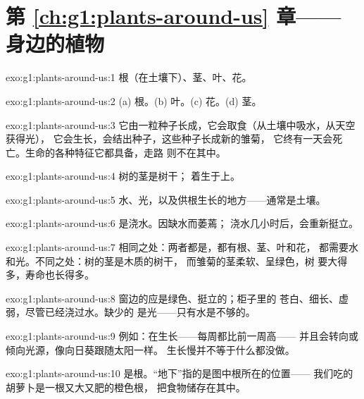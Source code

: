 \section*{第 \ref{ch:g1:plants-around-us} 章——身边的植物}

\begin{solution}{exo:g1:plants-around-us:1}
根（在土壤下）、茎、叶、花。
\end{solution}

\begin{solution}{exo:g1:plants-around-us:2}
(a) 根。(b) 叶。(c) 花。(d) 茎。
\end{solution}

\begin{solution}{exo:g1:plants-around-us:3}
它由一粒种子长成，它会取食（从土壤中吸水，从天空获得光），
它会生长，会结出种子，这些种子长成新的雏菊，
它终有一天会死亡。生命的各种特征它都具备，走路
则不在其中。
\end{solution}

\begin{solution}{exo:g1:plants-around-us:4}
树的茎是树干；
着生于上。
\end{solution}

\begin{solution}{exo:g1:plants-around-us:5}
水、光，以及供根生长的地方——通常是土壤。
\end{solution}

\begin{solution}{exo:g1:plants-around-us:6}
是浇水。因缺水而萎蔫；
浇水几小时后，会重新挺立。
\end{solution}

\begin{solution}{exo:g1:plants-around-us:7}
相同之处：两者都是，都有根、茎、叶和花，
都需要水和光。不同之处：树的茎是木质的树干，
而雏菊的茎柔软、呈绿色，树
要大得多，寿命也长得多。
\end{solution}

\begin{solution}{exo:g1:plants-around-us:8}
窗边的应是绿色、挺立的；柜子里的
苍白、细长、虚弱，尽管已经浇过水。缺少的
是光——只有水是不够的。
\end{solution}

\begin{solution}{exo:g1:plants-around-us:9}
例如：在生长——每周都比前一周高——
并且会转向或倾向光源，像向日葵跟随太阳一样。
生长慢并不等于什么都没做。
\end{solution}

\begin{solution}{exo:g1:plants-around-us:10}
是根。“地下”指的是图中根所在的位置——
我们吃的胡萝卜是一根又大又肥的橙色根，
把食物储存在其中。
\end{solution}
